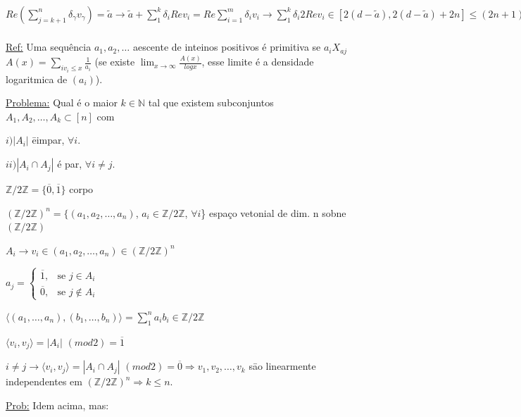 \documentclass[a4paper,12pt]{article}
\theoremstyle{plain} %
\theoremstyle{definition} %
\theoremstyle{remark} %
\begin{document}
	$Re\left(\sum\limits_{j=k+1}^n \delta_{\gamma}v_{\gamma}\right)=\tilde a \rightarrow \tilde a + \sum\limits_1^k \delta_iRev_i=Re\sum\limits_{i=1}^m \delta_i v_i\rightarrow \sum\limits_1^k \delta_i 2Rev_i\in [2(d-\tilde a), 2(d-\tilde a)+2n]\leqslant(2n+1)\left(\begin{smallmatrix}
		[k]\\
		\frac{k}{2}
	\end{smallmatrix}\right)\leqslant c (n+1) \frac{2^k}{\sqrt{k}}$
	
	\underline{Ref:} Uma sequ\^encia $a_1,a_2, \dotso $ aescente de inteinos positivos \'e primitiva se $a_iX_{aj}$
	$A(x)=\sum\limits_{iv_i\leqslant x} \frac{1}{a_i}$ (se existe $\displaystyle\lim_{x \to \infty} \frac{A(x)}{logx}$, esse limite \'e a densidade logaritmica de $(a_i)$).
	
	\vspace{2ex}\underline{Problema:} Qual \'e o maior $k\in \mathds{N}$ tal que existem subconjuntos $A_1, A_2, \dotso, A_k \subset [n]$ com
	
	$i) |A_i|$ \=eimpar, $\forall i$.
	
	$ii) |A_i\cap A_j|$ \'e par, $\forall i\neq j$.
	
	$\mathds{Z}/2\mathds{Z}=\{\overline{0},\overline{1}\}$ corpo
	
	$(\mathds{Z}/2\mathds{Z})^n=\{(a_1, a_2, \dotso, a_n)$, $a_i \in \mathds{Z}/2\mathds{Z}$, $\forall i$\} espa\c{c}o vetonial de dim. n sobne $(\mathds{Z}/2\mathds{Z})$
	
	$A_i\rightarrow v_i \in (a_1, a_2, \dotso, a_n) \in (\mathds{Z}/2\mathds{Z})^n$
	
	
	\begin{center} $    a_j=\begin{cases}
			\overline{1}, &\text{se }  j \in A_i \\
			\overline{0}, &\text{se } j\not\in A_i
		\end{cases}
		$  
	\end{center}
	
	
	$\langle (a_1, \dotso, a_n), (b_1, \dotso, b_n) \rangle =\sum\limits_1^n a_ib_i \in \mathds{Z}/2\mathds{Z}$
	
	$\langle v_i,v_j\rangle =|A_i|$ $(mod2)=\overline{1}$
	
	$i\neq j\rightarrow\langle v_i,v_j\rangle =|A_i\cap A_j|$ $(mod2)=\overline{0}\Rightarrow v_1, v_2,
	\dotso, v_k$ s\=ao linearmente independentes em $(\mathds{Z}/2\mathds{Z})^n\Rightarrow k\leqslant n$.
	
	\vspace{2ex}\underline{Prob:} Idem acima, mas:
	
\end{document}
